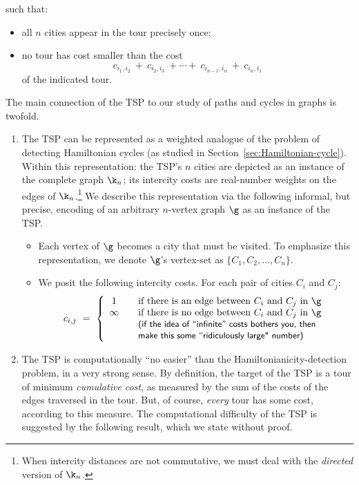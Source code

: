 \noindent such that:
\begin{itemize}
\item
all $n$ cities appear in the tour precisely once;
\item
no tour has cost smaller than the cost
\[ c_{i_1,i_2} \ + \ c_{i_2, i_3} \ + \cdots + \ c_{i_{n-1}, i_n} \ + \ c_{i_n, i_1}
\]
of the indicated tour.
\end{itemize}
The main connection of the TSP to our study of paths and cycles in graphs is twofold.
\begin{enumerate}
\item
The TSP can be represented as a weighted analogue of the problem of detecting Hamiltonian cycles (as studied in Section~\ref{sec:Hamiltonian-cycle}).  Within this representation: the TSP's $n$ cities are depicted as an instance of the complete graph $\k_n$; its intercity costs are real-number weights on the edges of $\k_n$.\footnote{When intercity distances are not commutative, we must deal with the {\em directed} version of $\k_n$.}  We describe this representation via the following informal, but precise, encoding of an arbitrary $n$-vertex graph $\g$ as an instance of the TSP.
  \begin{itemize}
  \item
Each vertex of $\g$ becomes a city that must be visited.  To emphasize this representation, we denote $\g$'s vertex-set as $\{C_1, C_2, \ldots, C_n\}$.
  \item
We posit the following intercity costs.  For each pair of cities $C_i$ and $C_j$:
\[ c_{i,j} \ = \ \left\{
\begin{array}{ccl}
1 & & \mbox{if there is an edge between $C_i$ and $C_j$ in $\g$} \\
\infty & & \mbox{if there is no edge between $C_i$ and $C_j$ in $\g$} \\
       & & \mbox{\small\sf (if the idea of ``infinite'' costs bothers you, then} \\
       & & \mbox{\small\sf make this some ``ridiculously large" number)}
\end{array}
\right.
\]
\end{itemize}

\item
The TSP is computationally ``no easier'' than the Hamiltonianicity-detection problem, in a very strong sense.  By definition, the target of the TSP is a tour of minimum {\em cumulative cost}, as measured by the sum of the costs of the edges traversed in the tour.  But, of course, {\em every} tour has some cost, according to this measure.  The computational difficulty of the TSP is suggested by the following result, which we state without proof.
\end{enumerate}

